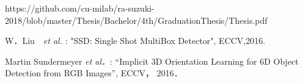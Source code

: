 \documentclass{jsarticle}
\begin{document}
%
%
%

\begin{thebibliography}{1}

{\scriptsize
{}
https://github.com/cu-milab/ra-suzuki-2018/blob/master/Thesis/Bachelor/4th/GraduationThesis/Thesis.pdf}


{\scriptsize
{}
W．Liu　{\em et al. }: "SSD: Single Shot MultiBox Detector", ECCV,2016.}

{\scriptsize 
{}
Martin Sundermeyer {\em et al．}: ``Implicit 3D Orientation Learning for 6D Object Detection from RGB Images'', ECCV， 2016．}

\end{thebibliography}
\end{document}
